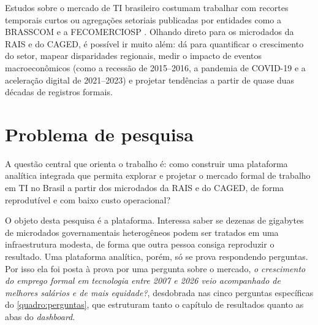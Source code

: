 Estudos sobre o mercado de TI brasileiro costumam trabalhar com recortes temporais curtos ou agregações setoriais publicadas por entidades como a BRASSCOM \cite{Brasscom2024} e a FECOMERCIOSP \cite{Fecomercio2024}. Olhando direto para os microdados da RAIS e do CAGED, é possível ir muito além: dá para quantificar o crescimento do setor, mapear disparidades regionais, medir o impacto de eventos macroeconômicos (como a recessão de 2015--2016, a pandemia de COVID-19 e a aceleração digital de 2021--2023) e projetar tendências a partir de quase duas décadas de registros formais.

\section{Problema de pesquisa}
\label{sec:problema}

A questão central que orienta o trabalho é: como construir uma plataforma analítica integrada que permita explorar e projetar o mercado formal de trabalho em TI no Brasil a partir dos microdados da RAIS e do CAGED, de forma reprodutível e com baixo custo operacional?

O objeto desta pesquisa é a plataforma. Interessa saber se dezenas de gigabytes de microdados governamentais heterogêneos podem ser tratados em uma infraestrutura modesta, de forma que outra pessoa consiga reproduzir o resultado. Uma plataforma analítica, porém, só se prova respondendo perguntas. Por isso ela foi posta à prova por uma pergunta sobre o mercado, \textit{o crescimento do emprego formal em tecnologia entre 2007 e 2026 veio acompanhado de melhores salários e de mais equidade?}, desdobrada nas cinco perguntas específicas do \autoref{quadro:perguntas}, que estruturam tanto o capítulo de resultados quanto as abas do \textit{dashboard}.

